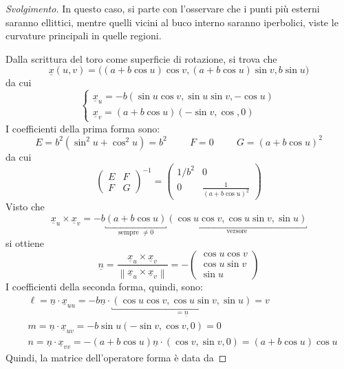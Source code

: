 \documentclass[12pt]{scrartcl}
\theoremstyle{style}
\newenvironment{svolgimento}{\renewcommand\qedsymbol{$\blacksquare$}\begin{proof}[Svolgimento]}{\end{proof}}
\numberwithin{equation}{subsection}
\begin{document}
\begin{svolgimento}
	In questo caso, si parte con l'osservare che i punti pi\`u esterni saranno ellittici, mentre quelli vicini al buco interno saranno iperbolici, viste le curvature principali in quelle regioni.

	Dalla scrittura del toro come superficie di rotazione, si trova che 
	\[
	\underline{x}(u,v) = \big( (a + b \cos u) \cos v, (a+b\cos u ) \sin v , b \sin u\big)
	\] 
	da cui
	\[
	\begin{cases}
		 \underline{x}_u = - b ( \sin u \cos v , \sin u \sin v, - \cos u)\\
		 \underline{x}_v = (a+b \cos u) (- \sin v , \cos ,0)
	\end{cases}
	\] 
	I coefficienti della prima forma sono:
	\[
	E = b^2 (\sin^2 u + \cos^2 u ) = b^2 \hspace{1cm} F = 0 \hspace{1cm}G = (a+b \cos u)^2
	\] 
	da cui
	\[
		\begin{pmatrix} E & F \\ F & G \end{pmatrix} ^{-1} = \begin{pmatrix} 1 / b^2 & 0 \\ 0 & \frac{1}{(a +b \cos u)^2} \end{pmatrix} 
	\] 
Visto che 
\[
	\underline{x}_u\times \underline{x}_v = -b \underbracket{( a + b \cos u )}_{\text{sempre }\neq 0 }  \underbracket{( \cos u \cos v , \cos u \sin v , \sin u)}_{\text{versore}} 
\] 
si ottiene
\[
\underline{n} = \frac{\underline{x}_u \times \underline{x}_v}{\left\lVert \underline{x}_u \times \underline{x}_v  \right\rVert } =- \begin{pmatrix} \cos u \cos v \\ \cos u \sin v \\ \sin u \end{pmatrix} 
\] 
I coefficienti della seconda forma, quindi, sono:
\[
\begin{split}
	&\ell  = \underline{n} \cdot \underline{x}_{uu} = - b \underline{n} \cdot \underbracket{(\cos u \cos v , \cos u \sin v , \sin u)}_{= \underline{n}}  = v\\
	& m = \underline{n}\cdot \underline{x}_{uv} = - b \sin u (- \sin v , \cos v , 0) = 0\\
	& n = \underline{n}\cdot \underline{x}_{v v } = - (a+ b \cos u) \underline{n}\cdot (\cos v , \sin v , 0 ) = (a + b \cos u) \cos u
\end{split}
\] 
Quindi, la matrice dell'operatore forma \`e data da

\end{svolgimento}
\end{document}
